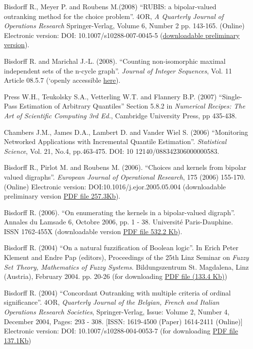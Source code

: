 \begin{thebibliography}{99.}
 Bisdorff R., Meyer P. and Roubens M.(2008) ``RUBIS: a bipolar-valued outranking method for the choice problem''. 4OR, \emph{A Quarterly Journal of Operations Research} Springer-Verlag, Volume 6,  Number 2 pp. 143-165. (Online) Electronic version: DOI: 10.1007/s10288-007-0045-5 (\href{http://hdl.handle.net/10993/23716}{downloadable preliminary version}).

 Bisdorff R. and Marichal J.-L. (2008). ``Counting non-isomorphic maximal independent sets of the n-cycle graph''. \emph{Journal of Integer Sequences}, Vol. 11 Article 08.5.7 (`openly accessible \href{https://cs.uwaterloo.ca/journals/JIS/VOL11/Marichal/marichal.html}{here}).

 Press W.H., Teukolsky S.A., Vetterling W.T. and Flannery B.P. (2007) ``Single-Pass Estimation of Arbitrary Quantiles'' Section 5.8.2 in \emph{Numerical Recipes: The Art of Scientific Computing 3rd Ed.}, Cambridge University Press, pp 435-438.

 Chambers J.M., James D.A., Lambert D. and Vander Wiel S. (2006) ``Monitoring Networked Applications with Incremental Quantile Estimation''. \emph{Statistical Science}, Vol. 21, No.4, pp.463-475. DOI: 10 12140/088342306000000583.

 Bisdorff R., Pirlot M. and Roubens M. (2006). ``Choices and kernels from bipolar valued digraphs''. \emph{European Journal of Operational Research}, 175 (2006) 155-170. (Online) Electronic version: DOI:10.1016/j.ejor.2005.05.004 (downloadable preliminary version \href{http://hdl.handle.net/10993/23720}{PDF file 257.3Kb}).

 Bisdorff R. (2006). ``On enumerating the kernels in a bipolar-valued digraph''. Annales du Lamsade 6, Octobre 2006, pp. 1 - 38. Université Paris-Dauphine. ISSN 1762-455X (downloadable version \href{http://hdl.handle.net/10993/38741}{PDF file 532.2 Kb}).

 Bisdorff R. (2004) ``On a natural fuzzification of Boolean logic''. In Erich Peter Klement and Endre Pap (editors), Proceedings of the 25th Linz Seminar on \emph{Fuzzy Set Theory, Mathematics of Fuzzy Systems}. Bildungszentrum St. Magdalena, Linz (Austria), February 2004. pp. 20-26 (for downloading \href{http://hdl.handle.net/10993/38740}{PDF file (133.4 Kb)})

 Bisdorff R. (2004) ``Concordant Outranking with multiple criteria of ordinal significance''. 4OR, \emph{Quarterly Journal of the Belgian, French and Italian Operations Research Societies}, Springer-Verlag, Issue: Volume 2, Number 4, December 2004, Pages: 293 - 308. [ISSN: 1619-4500 (Paper) 1614-2411 (Online)] Electronic version: DOI: 10.1007/s10288-004-0053-7 (for downloading \href{http://hdl.handle.net/10993/23721}{PDF file 137.1Kb})
	       

\end{thebibliography}
